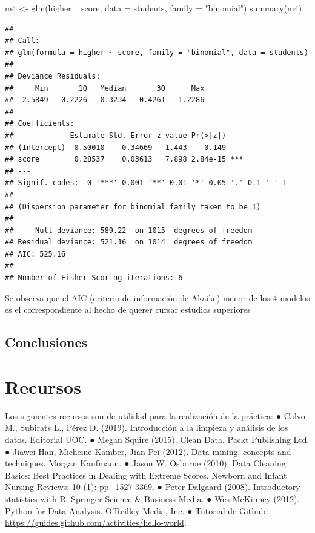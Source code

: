 \documentclass[]{article}
\newenvironment{Shaded}{\begin{snugshade}}{\end{snugshade}}
\newcommand{\DataTypeTok}[1]{\textcolor[rgb]{0.87,0.87,0.75}{#1}}
\newcommand{\KeywordTok}[1]{\textcolor[rgb]{0.94,0.87,0.69}{#1}}
\newcommand{\NormalTok}[1]{\textcolor[rgb]{0.80,0.80,0.80}{#1}}
\newcommand{\OperatorTok}[1]{\textcolor[rgb]{0.94,0.94,0.82}{#1}}
\newcommand{\StringTok}[1]{\textcolor[rgb]{0.80,0.58,0.58}{#1}}
\begin{document}
\begin{Shaded}
\begin{Highlighting}[]
\NormalTok{m4 <-}\StringTok{ }\KeywordTok{glm}\NormalTok{(higher }\OperatorTok{~}\StringTok{ }\NormalTok{score, }\DataTypeTok{data =}\NormalTok{ students, }\DataTypeTok{family =} \StringTok{"binomial"}\NormalTok{)}
\KeywordTok{summary}\NormalTok{(m4)}
\end{Highlighting}
\end{Shaded}

\begin{verbatim}
## 
## Call:
## glm(formula = higher ~ score, family = "binomial", data = students)
## 
## Deviance Residuals: 
##     Min       1Q   Median       3Q      Max  
## -2.5849   0.2226   0.3234   0.4261   1.2286  
## 
## Coefficients:
##             Estimate Std. Error z value Pr(>|z|)    
## (Intercept) -0.50010    0.34669  -1.443    0.149    
## score        0.28537    0.03613   7.898 2.84e-15 ***
## ---
## Signif. codes:  0 '***' 0.001 '**' 0.01 '*' 0.05 '.' 0.1 ' ' 1
## 
## (Dispersion parameter for binomial family taken to be 1)
## 
##     Null deviance: 589.22  on 1015  degrees of freedom
## Residual deviance: 521.16  on 1014  degrees of freedom
## AIC: 525.16
## 
## Number of Fisher Scoring iterations: 6
\end{verbatim}

Se observa que el AIC (criterio de información de Akaike) menor de los 4
modelos es el correspondiente al hecho de querer cursar estudios
superiores

\hypertarget{conclusiones}{%
\subsection{Conclusiones}\label{conclusiones}}

\hypertarget{recursos}{%
\section{Recursos}\label{recursos}}

Los siguientes recursos son de utilidad para la realización de la
práctica: ● Calvo M., Subirats L., Pérez D. (2019). Introducción a la
limpieza y análisis de los datos. Editorial UOC. ● Megan Squire (2015).
Clean Data. Packt Publishing Ltd. ● Jiawei Han, Micheine Kamber, Jian
Pei (2012). Data mining: concepts and techniques. Morgan Kaufmann. ●
Jason W. Osborne (2010). Data Cleaning Basics: Best Practices in Dealing
with Extreme Scores. Newborn and Infant Nursing Reviews; 10 (1):
pp.~1527-3369. ● Peter Dalgaard (2008). Introductory statistics with R.
Springer Science \& Business Media. ● Wes McKinney (2012). Python for
Data Analysis. O'Reilley Media, Inc. ● Tutorial de Github
\url{https://guides.github.com/activities/hello-world}.
\end{document}
